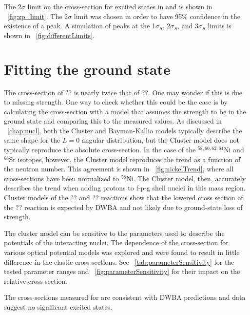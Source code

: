 The $2\sigma$ limit on the cross-section for excited \zp states in  and  is shown in {\fig}~\ref{fig:zp_limit}.  The $2\sigma$ limit was chosen in order to have 95\% confidence in the existence of a peak.  A simulation of peaks at the 1$\sigma_S$, 2$\sigma_S$, and 3$\sigma_S$ limits is shown in {\fig}~\ref{fig:differentLimits}.

\section{Fitting the \zp ground state}

The cross-section of ?? is nearly twice that of ??.  One may wonder if this is due to missing \zp strength.  One way to check whether this could be the case is by calculating the cross-section with a model that assumes the \zp strength to be in the ground state and comparing this to the measured values.  As discussed in {\chap}~\ref{chap:nucl}, both the Cluster and Bayman-Kallio models typically describe the same shape for the $L=0$ angular distribution, but the Cluster model does not typically reproduce the absolute cross-section.  In the case of the $^{58,60,62,64}$Ni and $^{68}$Sr isotopes, however, the Cluster model reproduces the trend as a function of the neutron number.  This agreement is shown in {\fig}~\ref{fig:nickelTrend}, where all cross-sections have been normalized to $^{58}$Ni.  The Cluster model, then, accurately describes the trend when adding protons to f-p-g shell nuclei in this mass region.  Cluster models of the ?? and ?? reactions show that the lowered cross section of the ?? reaction is expected by DWBA and not likely due to ground-state loss of \zp strength.   

The cluster model can be sensitive to the parameters used to describe the potentials of the interacting nuclei.  The dependence of the cross-section for various  optical potential models was explored and were found to result in little difference in the elastic cross-sections.  See {\tab}~\ref{tab:parameterSensitivity} for the tested parameter ranges and {\fig}~\ref{fig:parameterSensitivity} for their impact on the relative cross-section.

The cross-sections measured for \reaction are consistent with DWBA predictions and data suggest no significant excited \zp states.
%
% 
% 
